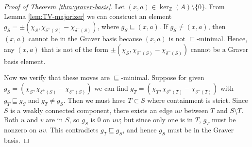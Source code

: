 \documentclass[pdflatex,sn-mathphys-num]{sn-jnl}%
\newcommand{\Z}{\mathbb{Z}} %
\begin{document}
\begin{proof}[Proof of Theorem \ref{thm:graver-basis}] 
    Let $(x, a) \in \ker_{\Z}(A) \setminus \{0\}$. From Lemma \ref{lem:TV-majorizer} we can construct an element $g_S = \pm (\chi_S, \chi_{\delta^+(S)} - \chi_{\delta^-(S)})$, where $g_S \sqsubseteq (x, a)$. If $g_S \ne (x, a)$, then $(x,a)$ cannot be in the Graver basis because $(x,a)$ is not $\sqsubseteq$-minimal. Hence, any $(x,a)$ that is not of the form $\pm (\chi_S, \chi_{\delta^+(S)} - \chi_{\delta^-(S)})$ cannot be a Graver basis element.

    Now we verify that these moves are $\sqsubseteq$-minimal. Suppose for given $g_S = (\chi_S, \chi_{\delta^+(S)} - \chi_{\delta^-(S)})$ we can find $g_T = (\chi_T, \chi_{\delta^+(T)} - \chi_{\delta^-(T)})$ with $g_T \sqsubseteq g_S$ and $g_T \ne g_S$. Then we must have $T \subset S$ where containment is strict. Since $S$ is a weakly connected component, there exists an edge $uv$ between $T$ and $S \setminus T$. Both $u$ and $v$ are in $S$, so $g_S$ is 0 on $uv$; but since only one is in $T$, $g_T$ must be nonzero on $uv$. This contradicts $g_T \sqsubseteq g_S$, and hence $g_S$ must be in the Graver basis.
\end{proof}
\end{document}

